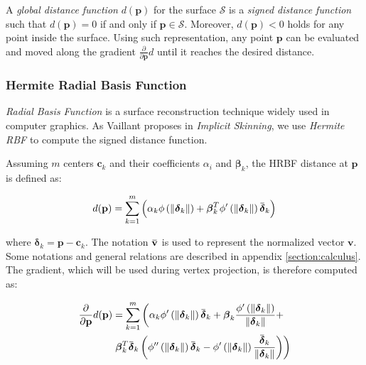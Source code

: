 \documentclass[a4paper,10pt]{article}
\newcommand{\overbar}[1]{\mkern 1.5mu\overline{\mkern-1.5mu#1\mkern-1.5mu}\mkern 1.5mu}
\begin{document}
\begin{multicols}{2}
A \emph{global distance function} $d(\mathbf{p})$ for the surface $\mathcal{S}$ is a \emph{signed distance function} such that $d(\mathbf{p})=0$ if and only if $\mathbf{p}\in \mathcal{S}$.
Moreover, $d(\mathbf{p})<0$ holds for any point inside the surface.
Using such representation, any point $\mathbf{p}$ can be evaluated and moved along the gradient $\frac{\partial}{\partial \mathbf{p}} d$ until it reaches the desired distance.


\subsubsection{Hermite Radial Basis Function}
\label{section:hrbf}

\emph{Radial Basis Function} is a surface reconstruction technique widely used in computer graphics.
As Vaillant proposes in \emph{Implicit Skinning}\cite{Vaillant:2013}, we use \emph{Hermite RBF} \cite{Macedo:2009:HII:1729646.1730288} to compute the signed distance function.

Assuming $m$ centers $\mathbf{c}_k$ and their coefficients $\alpha_i$ and $\boldsymbol\beta_k$, the HRBF distance at $\mathbf{p}$ is defined as:

\begin{equation*}
d(\mathbf{p}) = \sum_{k=1}^m \left(\alpha_k \phi\left( \left\| \boldsymbol\delta_k \right\| \right) +
\boldsymbol\beta_k^T \phi' \left( \left\| \boldsymbol\delta_k \right\| \right) \overbar{\boldsymbol\delta}_k \right)
\end{equation*}

where $\boldsymbol\delta_k = \mathbf{p} - \mathbf{c}_k$.
The notation $\overbar{\mathbf{v}}$ is used to represent the normalized vector $\mathbf{v}$.
Some notations and general relations are described in appendix \ref{section:calculus}.
The gradient, which will be used during vertex projection, is therefore computed as:

\begin{equation*}
\begin{split}
\frac{\partial}{\partial \mathbf{p}} d(\mathbf{p}) &
= \sum_{k=1}^m \left(\alpha_k \phi'\left( \left\| \boldsymbol\delta_k \right\| \right) \overbar{\boldsymbol\delta}_k +
\boldsymbol\beta_k \frac{\phi'\left( \left\| \boldsymbol\delta_k \right\| \right)}{\left\| \boldsymbol\delta_k \right\|} + \right. \\
& \left. \boldsymbol\beta_k^T \overbar{\boldsymbol\delta}_k \left( \phi'' \left( \left\| \boldsymbol\delta_k \right\| \right) \overbar{\boldsymbol\delta}_k - \phi'\left( \left\| \boldsymbol\delta_k \right\| \right) \frac{\overbar{\boldsymbol\delta}_k}{\left\| \boldsymbol\delta_k \right\|} \right) \right)
\end{split}
\end{equation*}


\end{multicols}
\end{document}
